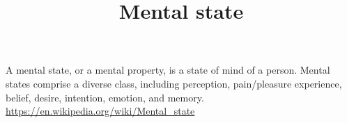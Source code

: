 \documentclass[a4paper]{article}
\title{Mental state}
\date{}
\begin{document}
    \maketitle
    A mental state, or a mental property, is a state of mind of a person. Mental states comprise a diverse class, including perception, pain/pleasure experience, belief, desire, intention, emotion, and memory.
    \url{https://en.wikipedia.org/wiki/Mental_state}
    
    
\end{document}
